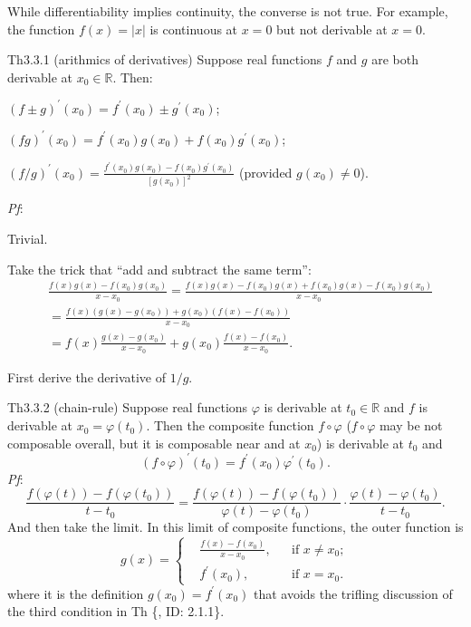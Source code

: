\documentclass{article}
\begin{document}
\begin{Rmk}{}
    \textcolor{Th}{While differentiability implies continuity, the converse is not true. For example, the function $f(x) = |x|$ is continuous at $x=0$ but not derivable at $x=0$.}
\end{Rmk}

\begin{Th}{Th3.3.1 (arithmics of derivatives)}
    Suppose real functions $f$ and $g$ are both derivable at $x_0\in\mathbb{R}$. Then:
    \begin{compactenum}
        \item $(f\pm g)^\prime(x_0) = f^\prime(x_0) \pm g^\prime(x_0)$;
        \item $(fg)^\prime(x_0) = f^\prime(x_0)g(x_0) + f(x_0)g^\prime(x_0)$;
        \item $(f/g)^\prime(x_0) = \frac{f^\prime(x_0)g(x_0) - f(x_0)g^\prime(x_0)}{[g(x_0)]^2}$ (provided $g(x_0)\neq 0$).
    \end{compactenum}
    \tcblower
    \textit{Pf}:
    \begin{compactenum}
        \item Trivial.
        \item Take the trick that ``add and subtract the same term'':
        $$
        \begin{aligned}
            & \frac{f(x)g(x) - f(x_0)g(x_0)}{x-x_0} = \frac{f(x)g(x) - f(x_0)g(x) + f(x_0)g(x) - f(x_0)g(x_0)}{x-x_0} \\
            &= \frac{f(x)(g(x)-g(x_0)) + g(x_0)(f(x)-f(x_0))}{x-x_0} \\
            &= f(x)\frac{g(x)-g(x_0)}{x-x_0} + g(x_0)\frac{f(x)-f(x_0)}{x-x_0}.
        \end{aligned}
        $$
        \item First derive the derivative of $1/g$.
    \end{compactenum}
\end{Th}

\begin{Th}{Th3.3.2 (chain-rule)}
    Suppose real functions $\varphi$ is derivable at $t_0\in\mathbb{R}$ and $f$ is derivable at $x_0 = \varphi(t_0)$. Then the composite function $f\circ\varphi$ ($f\circ\varphi$ may be not composable overall, but it is composable near and at $x_0$) is derivable at $t_0$ and 
    $$ (f\circ\varphi)^\prime(t_0) = f^\prime(x_0)\varphi^\prime(t_0). $$
    \tcblower
    \textit{Pf}: $$ \frac{f(\varphi(t))-f(\varphi(t_0))}{t-t_0} = \frac{f(\varphi(t))-f(\varphi(t_0))}{\varphi(t)-\varphi(t_0)}\cdot \frac{\varphi(t)-\varphi(t_0)}{t-t_0}. $$
    And then take the limit. In this limit of composite functions, the outer function is
    $$ g(x) = \left\{
        \begin{aligned}
            &\frac{f(x)-f(x_0)}{x-x_0}, && \text{if } x\neq x_0;\\
            &f^\prime(x_0), && \text{if } x = x_0.
        \end{aligned}\right.
    $$
    where it is the definition $g(x_0) = f^\prime(x_0)$ that avoids the trifling discussion of the third condition in Th \{, ID: 2.1.1\}.
\end{Th}
\end{document}
